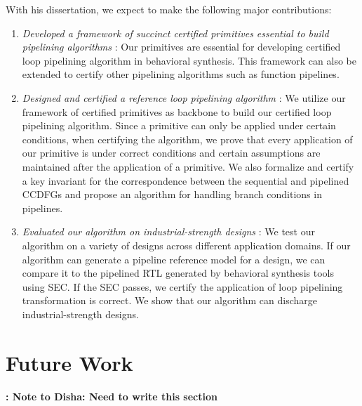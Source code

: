 
With his dissertation, we expect to make the following major contributions:
\begin{enumerate}[--]
\item {\em Developed a framework of succinct certified primitives essential to build pipelining algorithms} : Our primitives are essential for developing certified loop pipelining algorithm in behavioral synthesis. This framework can also be extended to certify other pipelining algorithms such as function pipelines.
\item {\em Designed and certified a reference loop pipelining algorithm} : We utilize our framework of certified primitives as backbone to build our certified loop pipelining algorithm. Since a primitive can only be applied under certain conditions, when certifying the algorithm, we prove that every application of our primitive is under correct conditions and certain assumptions are maintained after the application of a primitive. We also formalize and certify a key invariant for the correspondence between the sequential and pipelined CCDFGs and propose an algorithm for handling branch conditions in pipelines.
\item {\em Evaluated our algorithm on industrial-strength designs} : We test our algorithm on a variety of designs across different application domains. If our algorithm can generate a pipeline reference model for a design, we can compare it to the pipelined RTL generated by behavioral synthesis tools using SEC. If the SEC passes, we certify the application of loop pipelining transformation is correct. We show that our algorithm can discharge industrial-strength designs.
\end{enumerate} 

\section{Future Work}

{\bf: Note to Disha: Need to write this section}